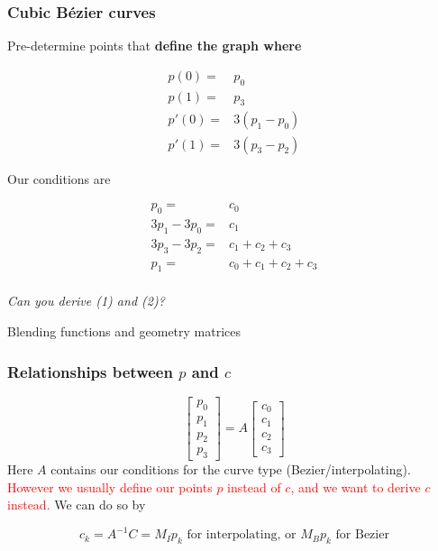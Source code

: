 \documentclass{beamer}
\begin{document}
\begin{frame}
    \frametitle{Cubic Bézier curves}
    
    Pre-determine points that \textbf{define the graph where}

    \begin{eqnarray*}
        p(0) =& p_0\\
        p(1) =& p_3\\
        p'(0) =& 3(p_1 - p_0)\\
        p'(1) =& 3(p_3 - p_2)
    \end{eqnarray*}

    Our conditions are

    \begin{eqnarray}
        p_0 =& c_0\\
        3p_1 - 3p_0 =& c_1\\
        3p_3 - 3p_2 =& c_1 + c_2 + c_3\\
        p_1 =& c_0 + c_1 + c_2 + c_3\\
    \end{eqnarray}

    \textit{Can you derive (1) and (2)?}
\end{frame}

\begin{frame}
    \AlegreyaExtraBold \LARGE
    Blending functions and geometry matrices
\end{frame}

\begin{frame}
    \frametitle{Relationships between $p$ and $c$}

    \begin{equation*}
        \begin{bmatrix}
            p_0 \\ p_1 \\ p_2 \\ p_3
        \end{bmatrix} = A \begin{bmatrix}
            c_0 \\ c_1 \\ c_2 \\ c_3
        \end{bmatrix}
    \end{equation*}
    Here $A$ contains our conditions for the curve type (Bezier/interpolating).\\
    \vspace{1em}
    \textcolor{red}{However we usually define our points $p$ instead of $c$, and we want to derive $c$ instead.}
    We can do so by

    \begin{equation*}
        c_k = A^{-1}C = M_I p_k \text{ for interpolating, or }  M_B p_k \text{ for Bezier}
    \end{equation*}

\end{frame}
\end{document}
